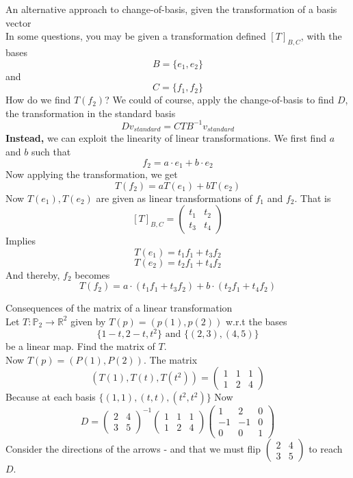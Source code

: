 \documentclass[journal, letterpaper]{IEEEtran}
\begin{document}
    \begin{myboxr}{An alternative approach to change-of-basis, given the transformation of a basis vector} \\ 
    In some questions, you may be given a transformation defined $[T]_{B, C}$, with the bases 
    $$ B = \{e_1, e_2\}$$
    and 
    $$ C = \{f_1, f_2\}$$
    How do we find $T(f_2)$? We could of course, apply the change-of-basis to find $D$, the transformation in the standard basis 
    $$ Dv_{standard} = CTB^{-1}v_{standard}$$
    \textbf{Instead,} we can exploit the linearity of linear transformations. We first find $a$ and $b$ such that
    $$ f_2 = a \cdot e_1 + b \cdot e_2$$
    Now applying the transformation, we get 
    $$ T(f_2) = a T(e_1) + b T(e_2)$$
    Now $T(e_1), T(e_2)$ are given as linear transformations of $f_1$ and $f_2$. That is
    $$ [T]_{B, C} = \begin{pmatrix}
        t_1 & t_2 \\ t_3 & t_4
    \end{pmatrix}$$
    Implies
    $$ T(e_1) = t_1 f_1 + t_3 f_2$$
    $$ T(e_2) = t_2 f_1 + t_4 f_2$$
    And thereby, $f_2$ becomes
    $$ T(f_2) = a \cdot(t_1f_1 + t_3f_2) + b\cdot (t_2f_1 + t_4f_2)$$
    \end{myboxr}
    \begin{myboxg}{Consequences of the matrix of a linear transformation} \\ 
        Let $T : \mathbb{P}_2 \to \mathbb{R}^2$ given by $T(p) = (p(1), p(2))$ w.r.t the bases 
        $$ \{1-t, 2-t, t^2\} \text{ and }\{(2, 3), (4, 5)\}$$
        be a linear map. Find the matrix of $T$.
        \newline \\ 
        Now $T(p) = (P(1), P(2))$. The matrix
        $$ (T(1), T(t), T(t^2)) = \begin{pmatrix}
            1 & 1 & 1 \\ 1 & 2 & 4
        \end{pmatrix}$$
        Because at each basis $\{(1, 1), (t, t), (t^2, t^2) \} $
        Now $$ D = \begin{pmatrix}
            2 & 4 \\ 3 & 5
        \end{pmatrix}^{-1} \begin{pmatrix}
            1 & 1 & 1 \\ 1 & 2 & 4
        \end{pmatrix} \begin{pmatrix}
            1 & 2 & 0 \\ -1 & -1 & 0 \\ 0 & 0 &1
        \end{pmatrix}$$
        Consider the directions of the arrows - and that we must flip $\begin{pmatrix}
        2 & 4 \\ 3 & 5
    \end{pmatrix}$ to reach $D$.
    \end{myboxg}
\end{document}
